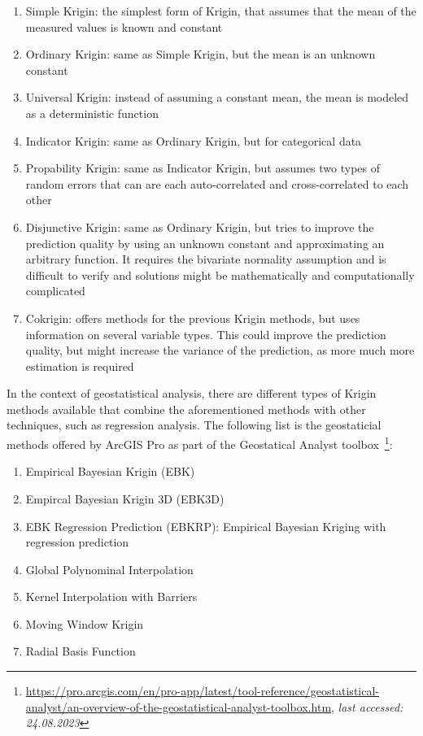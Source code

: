 \begin{enumerate}
    \item Simple Krigin: the simplest form of Krigin, that assumes that the mean of the measured values is known and constant
    \item Ordinary Krigin: same as Simple Krigin, but the mean is an unknown constant
    \item Universal Krigin: instead of assuming a constant mean, the mean is modeled as a deterministic function
    \item Indicator Krigin: same as Ordinary Krigin, but for categorical data
    \item Propability Krigin: same as Indicator Krigin, but assumes two types of random errors that can are each auto-correlated and cross-correlated to each other
    \item Disjunctive Krigin: same as Ordinary Krigin, but tries to improve the prediction quality by using an unknown constant and approximating an arbitrary function. It requires the bivariate normality assumption and is difficult to verify and solutions might be mathematically and computationally complicated
    \item Cokrigin: offers methods for the previous Krigin methods, but uses information on several variable types. This could improve the prediction quality, but might increase the variance of the prediction, as more much more estimation is required
\end{enumerate}

In the context of geostatistical analysis, there are different types of Krigin methods available that combine the aforementioned methods with other techniques, such as regression analysis. The following list is the geostaticial methods offered by ArcGIS Pro as part of the Geostatical Analyst toolbox~\footnote{\url{https://pro.arcgis.com/en/pro-app/latest/tool-reference/geostatistical-analyst/an-overview-of-the-geostatistical-analyst-toolbox.htm}, \textit{last accessed: 24.08.2023}}:

\begin{enumerate}
    \item Empirical Bayesian Krigin (EBK)
    \item Empircal Bayesian Krigin 3D (EBK3D)
    \item EBK Regression Prediction (EBKRP): Empirical Bayesian Kriging with regression prediction
    \item Global Polynominal Interpolation
    \item Kernel Interpolation with Barriers
    \item Moving Window Krigin
    \item Radial Basis Function
\end{enumerate}

